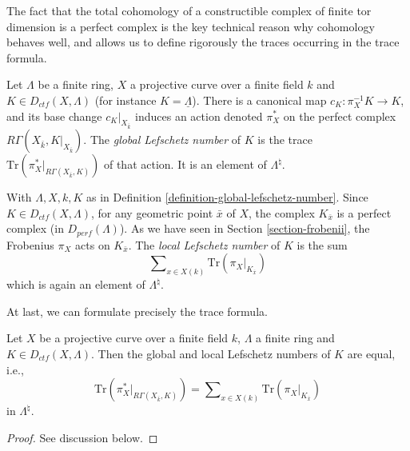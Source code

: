 \noindent
The fact that the total cohomology of a constructible complex of finite tor
dimension is a perfect complex is the key technical reason why cohomology
behaves well, and allows us to define rigorously the traces occurring in the
trace formula.

\begin{definition}
\label{definition-global-lefschetz-number}
Let $\Lambda$ be a finite ring, $X$ a projective curve over a finite field $k$
and $K \in D_{ctf}(X, \Lambda)$ (for instance $K = \underline\Lambda$).
There is a canonical map $c_K : \pi_X^{-1}K \to K$, and its base change
$c_K|_{X_{\bar k}}$ induces an action denoted $\pi_X^*$ on the perfect
complex $R\Gamma(X_{\bar k}, K|_{X_{\bar k}})$. The
{\it global Lefschetz number} of $K$ is the trace
$\text{Tr}(\pi_X^* |_{R\Gamma(X_{\bar k}, K)})$ of that action.
It is an element of $\Lambda^\natural$.
\end{definition}

\begin{definition}
\label{definition-local-lefschetz-number}
With $\Lambda, X, k, K$ as in
Definition \ref{definition-global-lefschetz-number}.
Since $K\in D_{ctf}(X, \Lambda)$, for any geometric point $\bar x$ of $X$,
the complex $K_{\bar x}$ is a perfect complex (in $D_{perf}(\Lambda)$). As we
have seen in Section \ref{section-frobenii}, the Frobenius $\pi_X$ acts on
$K_{\bar x}$. The {\it local Lefschetz number} of $K$ is the sum
$$
\sum\nolimits_{x\in X(k)} \text{Tr}(\pi_X |_{K_{\overline{x}}})
$$
which is again an element of $\Lambda^\natural$.
\end{definition}

\noindent
At last, we can formulate precisely the trace formula.

\begin{theorem}
\label{theorem-trace}
Let $X$ be a projective curve over a finite field $k$, $\Lambda$ a finite ring
and $K \in D_{ctf}(X, \Lambda)$. Then the global and local Lefschetz numbers
of $K$ are equal, i.e.,
\begin{equation}
\label{equation-trace-formula}
\text{Tr}(\pi^*_X |_{R\Gamma(X_{\bar k}, K)})
=
\sum\nolimits_{x\in X(k)} \text{Tr}(\pi_X |_{K_{\bar x}})
\end{equation}
in $\Lambda^\natural$.
\end{theorem}

\begin{proof}
See discussion below.
\end{proof}

